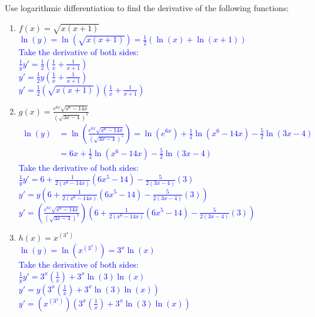 \documentclass{ximera}
\begin{document}
\begin{exercise}
    Use logarithmic differentiation to find the derivative of the following functions: 
    \begin{enumerate}
        \item $\displaystyle f(x)=\sqrt{x(x+1)}$\\
    \textcolor{blue}{ $\ln(y)=\ln(\sqrt{x(x+1)})=\frac12\left(\ln(x)+\ln(x+1)\right)$\\
    Take the derivative of both sides:\\
    $\frac{1}{y}y'=\frac12\left(\frac{1}{x}+\frac{1}{x+1}\right)$\\
    $y'=\frac12 y\left(\frac{1}{x}+\frac{1}{x+1}\right)$\\
    $y'=\frac12 \left(\sqrt{x(x+1)}\right)\left(\frac{1}{x}+\frac{1}{x+1}\right)$}
    
    \item $\displaystyle g(x)=\frac{e^{6x}\sqrt{x^6-14x}}{(\sqrt{3x-4})^5}$\\
    \textcolor{blue}{ \begin{align}
        \ln(y)&=\ln\left(\frac{e^{6x}\sqrt{x^6-14x}}{(\sqrt{3x-4})^5}\right)=\ln(e^{6x})+\frac12\ln(x^6-14x)-\frac52\ln(3x-4)\nonumber\\
        &=6x+\frac12\ln(x^6-14x)-\frac52\ln(3x-4)\nonumber
    \end{align}
    Take the derivative of both sides: \\
    $\frac{1}{y}y'=6+\frac{1}{2(x^6-14x)}(6x^5-14)-\frac{5}{2(3x-4)}(3)$\\
    $y'=y\left(6+\frac{1}{2(x^6-14x)}(6x^5-14)-\frac{5}{2(3x-4)}(3)\right)$\\
    $y'=\left(\frac{e^{6x}\sqrt{x^6-14x}}{(\sqrt{3x-4})^5}\right)\left(6+\frac{1}{2(x^6-14x)}(6x^5-14)-\frac{5}{2(3x-4)}(3)\right)$}
    
    \item $\displaystyle h(x)=x^{(3^x)}$\\
    \textcolor{blue}{ $\ln(y)=\ln(x^{(3^x)})=3^x\ln(x)$\\
    Take the derivative of both sides: \\
    $\frac1{y}y'=3^x\left(\frac1x\right)+3^x\ln(3)\ln(x)$\\
    $y'=y\left(3^x\left(\frac1x\right)+3^x\ln(3)\ln(x)\right)$\\
    $y'=\left(x^{(3^x)}\right)\left(3^x\left(\frac1x\right)+3^x\ln(3)\ln(x)\right)$\\}
    

\end{enumerate}
\end{exercise}
\end{document}
